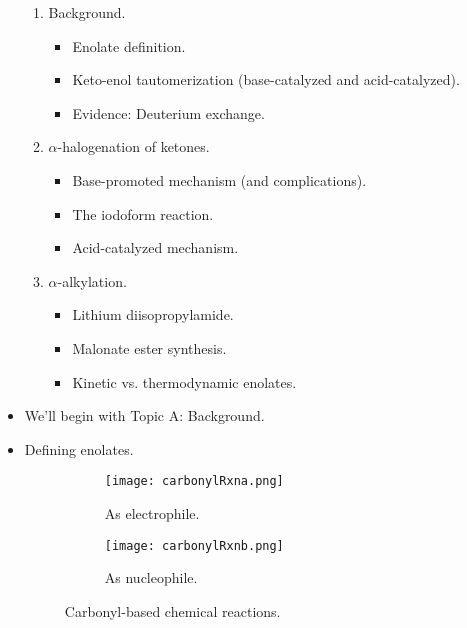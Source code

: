 \documentclass[../notes.tex]{subfiles}
\begin{document}
\begin{itemize}
\begin{enumerate}[label={\Alph*.}]
        \item Background.
        \begin{itemize}
            \item Enolate definition.
            \item Keto-enol tautomerization (base-catalyzed and acid-catalyzed).
            \item Evidence: Deuterium exchange.
        \end{itemize}
        \item $\alpha$-halogenation of ketones.
        \begin{itemize}
            \item Base-promoted mechanism (and complications).
            \item The iodoform reaction.
            \item Acid-catalyzed mechanism.
        \end{itemize}
        \item $\alpha$-alkylation.
        \begin{itemize}
            \item Lithium diisopropylamide.
            \item Malonate ester synthesis.
            \item Kinetic vs. thermodynamic enolates.
        \end{itemize}
    \end{enumerate}
    \pagebreak
    \item We'll begin with Topic A: Background.
    \item Defining enolates.
    \begin{figure}[h!]
        \centering
        \begin{subfigure}[b]{0.4\linewidth}
            \centering
            \texttt{[image: carbonylRxna.png]}
            \caption{As electrophile.}
            \label{fig:carbonylRxna}
        \end{subfigure}
        \begin{subfigure}[b]{0.4\linewidth}
            \centering
            \texttt{[image: carbonylRxnb.png]}
            \caption{As nucleophile.}
            \label{fig:carbonylRxnb}
        \end{subfigure}
        \caption{Carbonyl-based chemical reactions.}
        \label{fig:carbonylRxn}
    \end{figure}
    \begin{itemize}

\end{itemize}
\end{itemize}
\end{document}
